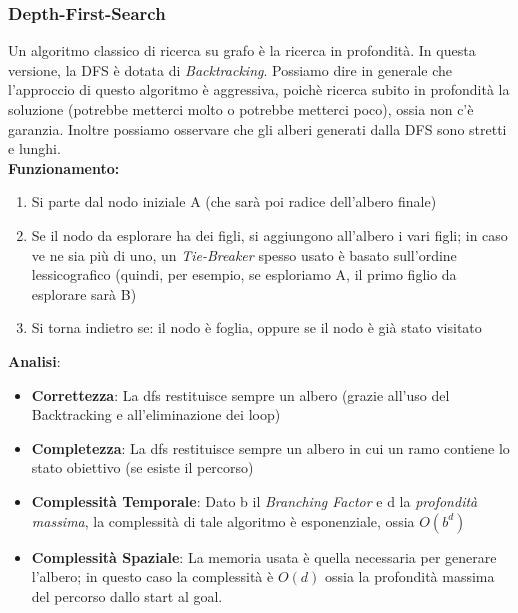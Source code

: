 \subsubsection{Depth-First-Search} \label{alg: dfs}
Un algoritmo classico di ricerca su grafo è la ricerca in profondità. In questa versione, la DFS è dotata di \textit{Backtracking}. Possiamo 
dire in generale che l'approccio di questo algoritmo è aggressiva, poichè ricerca subito in profondità la soluzione (potrebbe metterci molto o potrebbe metterci poco), ossia non c'è garanzia.
Inoltre possiamo osservare che gli alberi generati dalla DFS sono stretti e lunghi.\\
\smallskip
\textbf{Funzionamento:}
\begin{enumerate}
    \item Si parte dal nodo iniziale A (che sarà poi radice dell'albero finale)
    \item Se il nodo da esplorare ha dei figli, si aggiungono all'albero i vari figli; in caso ve ne sia più di uno,
    un \textit{Tie-Breaker} spesso usato è basato sull'ordine lessicografico (quindi, per esempio, se esploriamo A, il primo figlio da esplorare sarà B)
    \item Si torna indietro se: il nodo è foglia, oppure se il nodo è già stato visitato
\end{enumerate}

\textbf{Analisi}:
\begin{itemize}
    \item \textbf{Correttezza}: La dfs restituisce sempre un albero (grazie all'uso del Backtracking e all'eliminazione dei loop)
    \item \textbf{Completezza}: La dfs restituisce sempre un albero in cui un ramo contiene lo stato obiettivo (se esiste il percorso)
    \item \textbf{Complessità Temporale}: Dato b il \textit{Branching Factor} e d la \textit{profondità massima}, la complessità di tale algoritmo è esponenziale, ossia $O(b^d)$
    \item \textbf{Complessità Spaziale}: La memoria usata è quella necessaria per generare l'albero; in questo caso la complessità è $O(d)$ ossia la profondità massima del percorso dallo start al goal.

\end{itemize}

